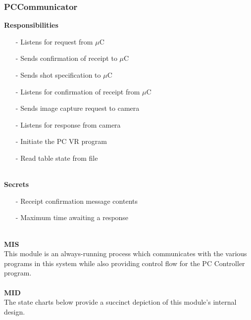 \documentclass[titlepage]{article}
\begin{document}
\subsubsection{PCCommunicator}
\textbf{Responsibilities}
\begin{itemize}
	\item[-] Listens for request from $\mu$C
	\item[-] Sends confirmation of receipt to $\mu$C
	\item[-] Sends shot specification to $\mu$C
	\item[-] Listens for confirmation of receipt from $\mu$C
	\item[-] Sends image capture request to camera
	\item[-] Listens for response from camera
	\item[-] Initiate the PC VR program
	\item[-] Read table state from file
\end{itemize}~\\
\textbf{Secrets}
\begin{itemize}
	\item[-] Receipt confirmation message contents
	\item[-] Maximum time awaiting a response
\end{itemize}~\\
\textbf{MIS}\\[2mm]
This module is an always-running process which communicates with the various programs in this system while also providing control flow for the PC Controller program.
\\\\
\textbf{MID}\\[2mm]
The state charts below provide a succinct depiction of this module's internal design.
\\\\
\end{document}
